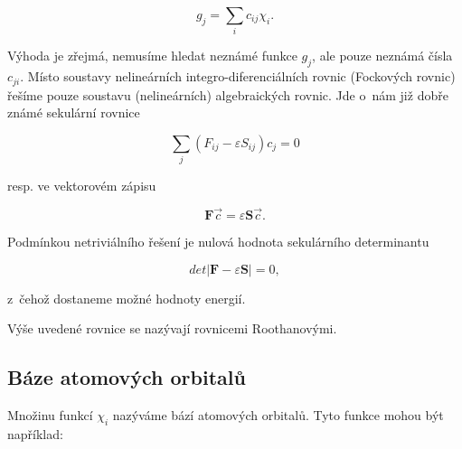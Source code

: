 \begin{equation}
g_j = \sum_i c_{ij} \chi_i.
\label{rov:VE-52}
\end{equation}

\noindent Výhoda je zřejmá, nemusíme hledat neznámé funkce $g_j$, ale pouze neznámá čísla $c_{ji}$. Místo soustavy nelineárních integro-diferenciálních rovnic (Fockových rovnic) řešíme pouze soustavu (nelineárních) algebraických rovnic. Jde o~nám již dobře známé sekulární rovnice

\begin{equation}
\sum_j (F_{ij} - \varepsilon S_{ij}) c_j = 0
\label{rov:VE-53}
\end{equation}

\noindent resp. ve vektorovém zápisu

\begin{equation}
\mathbf{F} \vec{c} = \varepsilon \mathbf{S} \vec{c}.
\label{rov:VE-54}
\end{equation}

Podmínkou netriviálního řešení je nulová hodnota sekulárního determinantu

\begin{equation}
det \vert \mathbf{F} - \varepsilon \mathbf{S} \vert = 0,
\label{rov:VE-55}
\end{equation}

z~čehož dostaneme možné hodnoty energií.

Výše uvedené rovnice se nazývají rovnicemi Roothanovými. 


\subsection{Báze atomových orbitalů}
\label{sec:AObasis}

Množinu funkcí $\chi_i$ nazýváme bází atomových orbitalů.  Tyto funkce mohou být například:
 
